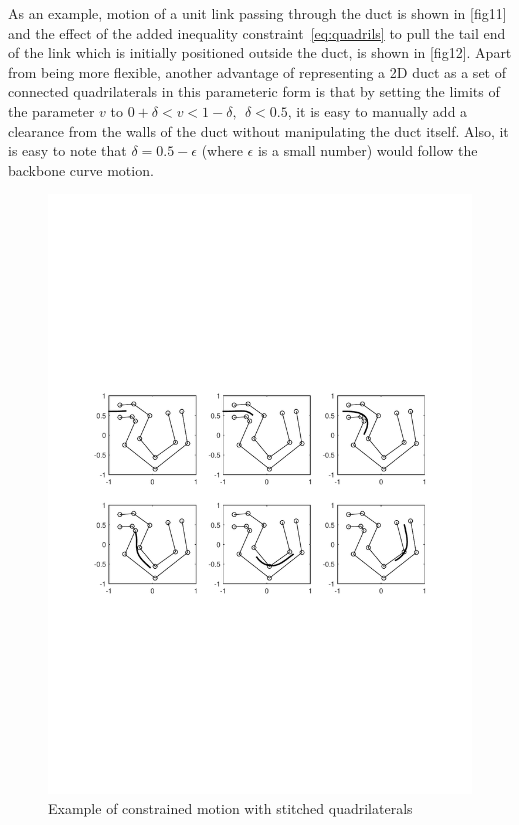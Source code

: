 \documentclass[12pt,a4]{article}
\begin{document}
As an example, motion of a unit link passing through the duct is shown in [fig11] and the effect of the added inequality constraint~\ref{eq:quadrils} to pull the tail end of the link which is initially positioned outside the duct, is shown in [fig12]. Apart from being more flexible, another advantage of representing a 2D duct as a set of connected quadrilaterals in this parameteric form is that by setting the limits of the parameter $v$ to $0+\delta < v< 1-\delta,~~\delta<0.5$, it is easy to manually add a clearance from the walls of the duct without manipulating the duct itself. Also, it is easy to note that $\delta=0.5-\epsilon$ (where $\epsilon$ is a small number) would follow the backbone curve motion.

\begin{figure}[h]
\centering
\includegraphics[scale=0.75]{figures/fig10.pdf}
\caption{ Example of constrained motion with stitched quadrilaterals \label{fig:motionquads}}
\end{figure}
\end{document}
